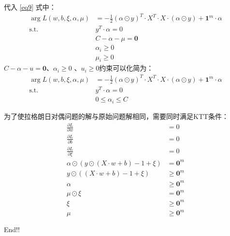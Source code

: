 \documentclass[12pt, a4paper, oneside]{ctexart}
\begin{document}
代入 \eqref{eq9} 式中： 
\begin{align}
    \mathop{\arg\max_{\alpha}}  L(w, b, \xi, {\alpha}, \mu) &= -\frac{1}{2}(\alpha \odot y)^T \cdot X^T \cdot X \cdot (\alpha \odot y) + \boldsymbol{1}^m \cdot \alpha \nonumber \\
    \mathrm{ s.t. }\ \   &y^T \cdot \alpha = 0 \nonumber \\
    &C - \alpha - \mu \nonumber  = \boldsymbol{0} \nonumber \\
    &\alpha_i \geq 0 \nonumber \\
    &\mu_i \geq 0 \nonumber 
\end{align}
$C - \alpha - u   = \boldsymbol{0} $、$ \alpha_i \geq 0 $ 、$u_i \geq 0 $约束可以化简为：
\begin{align}
    \mathop{\arg\max_{\alpha}}  L(w, b, \xi, {\alpha}, \mu) &= -\frac{1}{2}(\alpha \odot y)^T \cdot X^T \cdot X \cdot (\alpha \odot y) + \boldsymbol{1}^m \cdot \alpha \label{eq10}\\
    \mathrm{ s.t. }\ \   &y^T \cdot \alpha = 0 \nonumber \\
    & 0 \leq \alpha_i  \leq C \nonumber 
\end{align}

为了使拉格朗日对偶问题的解与原始问题解相同，需要同时满足KTT条件：
\begin{align}
    \frac{\partial L}{\partial w} &= 0 \nonumber \\
    \frac{\partial L}{\partial b} &= 0 \nonumber \\
    \frac{\partial L}{\partial \xi} &= 0 \nonumber \\
    {\alpha} \odot  (y \odot (X \cdot w + b) - 1 + \xi) &= \boldsymbol{0}^m \nonumber \\
    y \odot ((X \cdot w + b) - 1  + \xi) &\geq \boldsymbol{0}^m \nonumber \\
    {\alpha} &\geq \boldsymbol{0}^m  \nonumber \\
    \mu \odot \xi &=  \boldsymbol{0}^m \nonumber \\
    \xi &\geq \boldsymbol{0}^m  \nonumber \\
    \mu &\geq \boldsymbol{0}^m  \nonumber 
\end{align}

End!!
\end{document}
